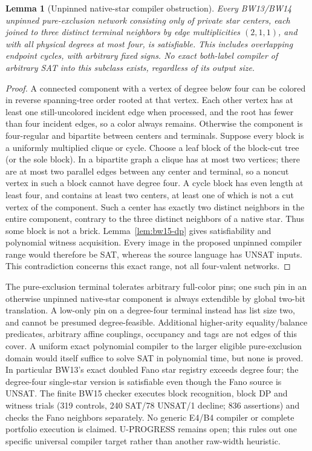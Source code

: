 \documentclass[11pt]{article}
\newtheorem{lemma}[theorem]{Lemma}
\begin{document}
\begin{lemma}[Unpinned native-star compiler obstruction]\label{lem:bw15-star}
Every BW13/BW14 unpinned pure-exclusion network consisting only of private star centers, each joined to three distinct terminal neighbors by edge multiplicities $(2,1,1)$, and with all physical degrees at most four, is satisfiable. This includes overlapping endpoint cycles, with arbitrary fixed signs. No exact both-label compiler of arbitrary SAT into this subclass exists, regardless of its output size.
\end{lemma}
\begin{proof}
A connected component with a vertex of degree below four can be colored in reverse spanning-tree order rooted at that vertex. Each other vertex has at least one still-uncolored incident edge when processed, and the root has fewer than four incident edges, so a color always remains. Otherwise the component is four-regular and bipartite between centers and terminals. Suppose every block is a uniformly multiplied clique or cycle. Choose a leaf block of the block-cut tree (or the sole block). In a bipartite graph a clique has at most two vertices; there are at most two parallel edges between any center and terminal, so a noncut vertex in such a block cannot have degree four. A cycle block has even length at least four, and contains at least two centers, at least one of which is not a cut vertex of the component. Such a center has exactly two distinct neighbors in the entire component, contrary to the three distinct neighbors of a native star. Thus some block is not a brick. Lemma~\ref{lem:bw15-dp} gives satisfiability and polynomial witness acquisition. Every image in the proposed unpinned compiler range would therefore be SAT, whereas the source language has UNSAT inputs. This contradiction concerns this exact range, not all four-valent networks.
\end{proof}
The pure-exclusion terminal tolerates arbitrary full-color pins; one such pin in an otherwise unpinned native-star component is always extendible by global two-bit translation. A low-only pin on a degree-four terminal instead has list size two, and cannot be presumed degree-feasible. Additional higher-arity equality/balance predicates, arbitrary affine couplings, occupancy and tags are not edges of this cover. A uniform exact polynomial compiler to the larger eligible pure-exclusion domain would itself suffice to solve SAT in polynomial time, but none is proved. In particular BW13's exact doubled Fano star registry exceeds degree four; the degree-four single-star version is satisfiable even though the Fano source is UNSAT. The finite BW15 checker executes block recognition, block DP and witness trials (319 controls, 240 SAT/78 UNSAT/1 decline; 836 assertions) and checks the Fano neighbors separately. No generic E4/B4 compiler or complete portfolio execution is claimed. U-PROGRESS remains open; this rules out one specific universal compiler target rather than another raw-width heuristic.
\end{document}
